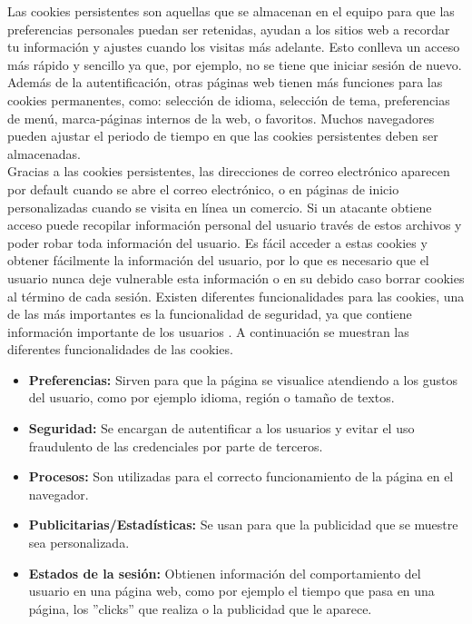 \documentclass[12pt, a4paper, titlepage]{report}
\begin{document}
		Las cookies persistentes son aquellas que se almacenan en el equipo para que las preferencias personales puedan ser retenidas, ayudan a los sitios web a recordar tu información y ajustes cuando los visitas más adelante. Esto conlleva un acceso más rápido y sencillo ya que, por ejemplo, no se tiene que iniciar sesión de nuevo. Además de la autentificación, otras páginas web tienen más funciones para las cookies permanentes, como: selección de idioma, selección de tema, preferencias de menú, marca-páginas internos de la web, o favoritos.
		Muchos navegadores pueden ajustar el periodo de tiempo en que las cookies persistentes deben ser almacenadas. \cite{refCookies} \\
		
		Gracias a las cookies persistentes, las direcciones de correo electrónico aparecen por default cuando se abre el correo electrónico, o en páginas de inicio personalizadas cuando se visita en línea un comercio. Si un atacante obtiene acceso puede recopilar información personal del usuario través de estos archivos y poder robar toda información del usuario. Es fácil acceder a estas cookies y obtener fácilmente la información del usuario, por lo que es necesario que el usuario nunca deje vulnerable esta información o en su debido caso borrar cookies al término de cada sesión.
		Existen diferentes funcionalidades para las cookies, una de las más importantes es la funcionalidad de seguridad, ya que contiene información importante de los usuarios \cite{refCookies}. A continuación se muestran las diferentes funcionalidades de las cookies.
		
		\begin{itemize}
		    \item \textbf{Preferencias:} Sirven para que la página se visualice atendiendo a los gustos del usuario, como por ejemplo idioma, región o tamaño de textos.
		    \item \textbf{Seguridad:} Se encargan de autentificar a los usuarios y evitar el uso fraudulento de las credenciales por parte de terceros.
		    \item \textbf{Procesos:} Son utilizadas para el correcto funcionamiento de la página en el navegador.
		    \item \textbf{Publicitarias/Estadísticas:} Se usan para que la publicidad que se muestre sea personalizada.
		    \item \textbf{Estados de la sesión:} Obtienen información del comportamiento del usuario en una página web, como por ejemplo el tiempo que pasa en una página, los ''clicks'' que realiza o la publicidad que le aparece.
		\end{itemize}
		
\end{document}
